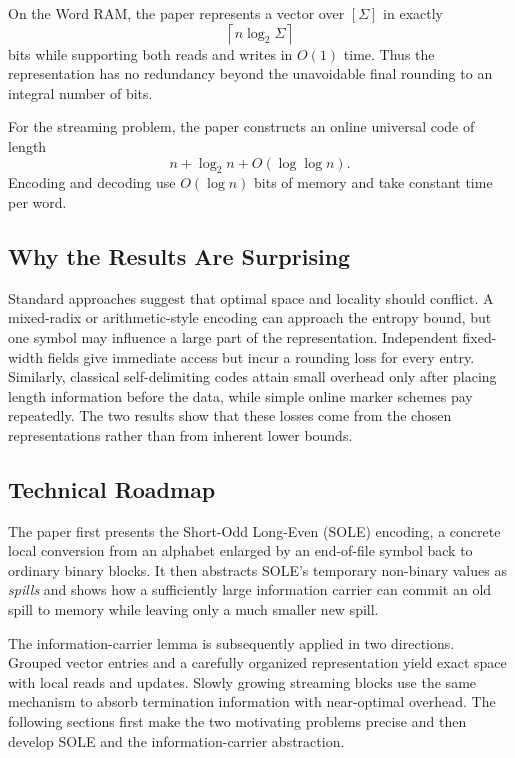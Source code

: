 On the Word RAM, the paper represents a vector over \([\Sigma]\) in exactly
\[
    \left\lceil n\log_2\Sigma\right\rceil
\]
bits while supporting both reads and writes in \(O(1)\) time. Thus the
representation has no redundancy beyond the unavoidable final rounding to an
integral number of bits.

For the streaming problem, the paper constructs an online universal code of
length
\[
    n+\log_2 n+O(\log\log n).
\]
Encoding and decoding use \(O(\log n)\) bits of memory and take constant time
per word.

\subsection{Why the Results Are Surprising}

Standard approaches suggest that optimal space and locality should conflict.
A mixed-radix or arithmetic-style encoding can approach the entropy bound,
but one symbol may influence a large part of the representation. Independent
fixed-width fields give immediate access but incur a rounding loss for every
entry. Similarly, classical self-delimiting codes attain small overhead only
after placing length information before the data, while simple online marker
schemes pay repeatedly. The two results show that these losses come from the
chosen representations rather than from inherent lower bounds.

\subsection{Technical Roadmap}

The paper first presents the Short-Odd Long-Even (SOLE) encoding, a concrete
local conversion from an alphabet enlarged by an end-of-file symbol back to
ordinary binary blocks. It then abstracts SOLE's temporary non-binary values
as \emph{spills} and shows how a sufficiently large information carrier can
commit an old spill to memory while leaving only a much smaller new spill.

The information-carrier lemma is subsequently applied in two directions.
Grouped vector entries and a carefully organized representation yield exact
space with local reads and updates. Slowly growing streaming blocks use the
same mechanism to absorb termination information with near-optimal overhead.
The following sections first make the two motivating problems precise and
then develop SOLE and the information-carrier abstraction.
